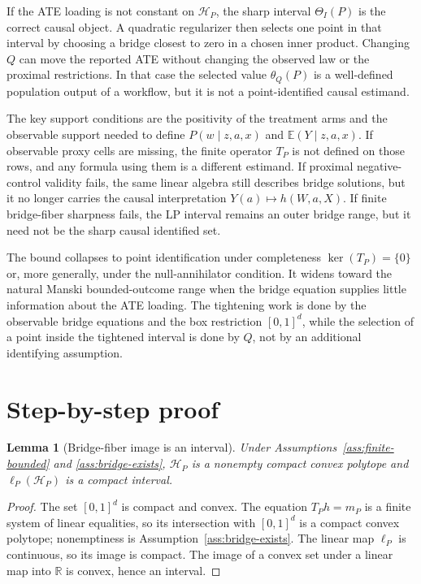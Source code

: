 \documentclass[11pt]{article}
\newcommand{\E}{\mathbb{E}}
\newcommand{\calH}{\mathcal{H}}
\newcommand{\R}{\mathbb{R}}
\theoremstyle{definition}
\theoremstyle{plain}
\newtheorem{lemma}{Lemma}
\theoremstyle{remark}
\begin{document}
If the ATE loading is not constant on \(\calH_P\), the sharp interval
\(\Theta_I(P)\) is the correct causal object.  A quadratic regularizer then
selects one point in that interval by choosing a bridge closest to zero in a
chosen inner product.  Changing \(Q\) can move the reported ATE without
changing the observed law or the proximal restrictions.  In that case the
selected value \(\theta_Q(P)\) is a well-defined population output of a
workflow, but it is not a point-identified causal estimand.

The key support conditions are the positivity of the treatment arms and the
observable support needed to define \(P(w\mid z,a,x)\) and
\(\E(Y\mid z,a,x)\).  If observable proxy cells are missing, the finite
operator \(T_P\) is not defined on those rows, and any formula using them is
a different estimand.  If proximal negative-control validity fails, the same
linear algebra still describes bridge solutions, but it no longer carries
the causal interpretation \(Y(a)\mapsto h(W,a,X)\).  If finite
bridge-fiber sharpness fails, the LP interval remains an outer bridge range,
but it need not be the sharp causal identified set.

The bound collapses to point identification under completeness
\(\ker(T_P)=\{0\}\) or, more generally, under the null-annihilator condition.
It widens toward the natural Manski bounded-outcome range when the bridge
equation supplies little information about the ATE loading.  The tightening
work is done by the observable bridge equations and the box restriction
\([0,1]^d\), while the selection of a point inside the tightened interval is
done by \(Q\), not by an additional identifying assumption.

\section{Step-by-step proof}
\begin{lemma}[Bridge-fiber image is an interval]\label{lem:image-interval}
Under Assumptions~\ref{ass:finite-bounded} and \ref{ass:bridge-exists},
\(\calH_P\) is a nonempty compact convex polytope and
\(\ell_P(\calH_P)\) is a compact interval.
\end{lemma}
\begin{proof}
The set \([0,1]^d\) is compact and convex.  The equation \(T_Ph=m_P\) is a
finite system of linear equalities, so its intersection with \([0,1]^d\) is
a compact convex polytope; nonemptiness is Assumption~\ref{ass:bridge-exists}.
The linear map \(\ell_P\) is continuous, so its image is compact.  The image
of a convex set under a linear map into \(\R\) is convex, hence an interval.
\end{proof}
\end{document}
